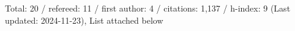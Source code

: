 Total: 20 / refereed: 11 / first author: 4 / citations: 1,137 / h-index: 9 (Last updated: 2024-11-23), List attached below